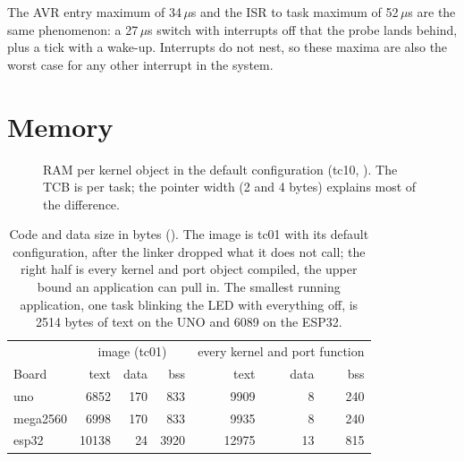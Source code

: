 The AVR entry maximum of 34\,$\mu$s and the ISR to task maximum of 52\,$\mu$s are the
same phenomenon: a 27\,$\mu$s switch with interrupts off that the probe lands behind,
plus a tick with a wake-up. Interrupts do not nest, so these maxima are also the worst
case for any other interrupt in the system.

\section{Memory}

\begin{figure}[htbp]
\centering
{}
\caption{RAM per kernel object in the default configuration (tc10, \measDate). The TCB
is per task; the pointer width (2 and 4 bytes) explains most of the difference.}
\label{fig:ram}
\end{figure}

\begin{table}[htbp]
\centering\small
\begin{tabular}{@{}lrrrrrr@{}}
\toprule
 & \multicolumn{3}{c}{image (tc01)} & \multicolumn{3}{c}{every kernel and port function} \\
Board & text & data & bss & text & data & bss \\
\midrule
uno       & 6852  & 170 & 833  & 9909  & 8  & 240 \\
mega2560  & 6998  & 170 & 833  & 9935  & 8  & 240 \\
esp32     & 10138 & 24  & 3920 & 12975 & 13 & 815 \\
\bottomrule
\end{tabular}
\caption{Code and data size in bytes (\measLabel). The image is tc01 with its default
configuration, after the linker dropped what it does not call; the right half is every
kernel and port object compiled, the upper bound an application can pull in. The
smallest running application, one task blinking the LED with everything off, is 2514
bytes of text on the UNO and 6089 on the ESP32.}
\label{tab:size}
\end{table}

